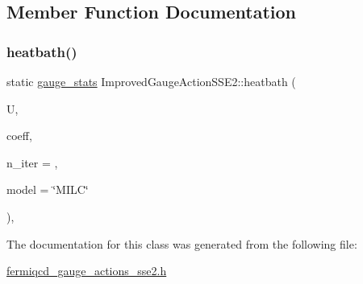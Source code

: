 \subsection{Member Function Documentation}
\mbox{\label{class_improved_gauge_action_s_s_e2_acbc479ba8ed2d4e8fbb42f703b59570c}} 
\subsubsection{\texorpdfstring{heatbath()}{heatbath()}}
{\footnotesize\ttfamily static \hyperlink{classgauge__stats}{gauge\+\_\+stats} Improved\+Gauge\+Action\+S\+S\+E2\+::heatbath (\begin{DoxyParamCaption}\item[{\hyperlink{classgauge__field}{gauge\+\_\+field} \&}]{U,  }\item[{\hyperlink{classcoefficients}{coefficients} \&}]{coeff,  }\item[{int}]{n\+\_\+iter = {},  }\item[{string}]{model = {\ttfamily \char`\"{}MILC\char`\"{}} }\end{DoxyParamCaption})\hspace{0.3cm}{\ttfamily [inline]}, {\ttfamily [static]}}



The documentation for this class was generated from the following file\+:\begin{DoxyCompactItemize}
\item 
\hyperlink{fermiqcd__gauge__actions__sse2_8h}{fermiqcd\+\_\+gauge\+\_\+actions\+\_\+sse2.\+h}\end{DoxyCompactItemize}
